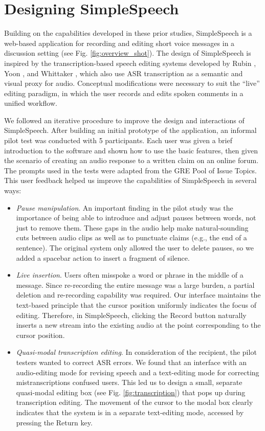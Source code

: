 
\section{Designing SimpleSpeech}

Building on the capabilities developed in these prior studies, SimpleSpeech is a web-based application for recording and editing short voice messages in a discussion setting (see Fig. \ref{fig:overview_shot}).
The design of SimpleSpeech is inspired by the transcription-based speech editing systems developed by Rubin \cite{rubin}, Yoon \cite{yoon}, and Whittaker \cite{whittaker_semantic}, which also use ASR transcription as a semantic and visual proxy for audio.
Conceptual modifications were necessary to suit the ``live'' editing paradigm, in which the user records and edits spoken comments in a unified workflow.

We followed an iterative procedure to improve the design and interactions of SimpleSpeech.
After building an initial prototype of the application, an informal pilot test was conducted with 5 participants. 
Each user was given a brief introduction to the software and shown how to use the basic features, then given the scenario of creating an audio response to a written claim on an online forum. 
The prompts used in the tests were adapted from the GRE Pool of Issue Topics.
This user feedback helped us improve the capabilities of SimpleSpeech in several ways:

\begin{itemize}
	\item \emph{Pause manipulation}. An important finding in the pilot study was the importance of being able to introduce and adjust pauses between words, not just to remove them.
	These gaps in the audio help make natural-sounding cuts between audio clips as well as to punctuate claims (e.g., the end of a sentence). 
	The original system only allowed the user to delete pauses, so we added a spacebar action to insert a fragment of silence.
	\item \emph{Live insertion}. Users often misspoke a word or phrase in the middle of a message.
	Since re-recording the entire message was a large burden, a partial deletion and re-recording capability was required.
	Our interface maintains the text-based principle that the cursor position uniformly indicates the focus of editing.
	Therefore, in SimpleSpeech, clicking the Record button naturally inserts a new stream into the existing audio at the point corresponding to the cursor position.
	\item \emph{Quasi-modal transcription editing}. In consideration of the recipient, the pilot testers wanted to correct ASR errors.
	We found that an interface with an audio-editing mode for revising speech and a text-editing mode for correcting mistranscriptions confused users.
	This led us to design a small, separate quasi-modal editing box (see Fig. \ref{fig:transcription}) that pops up during transcription editing.
	The movement of the cursor to the modal box clearly indicates that the system is in a separate text-editing mode, accessed by pressing the Return key.
\end{itemize}




